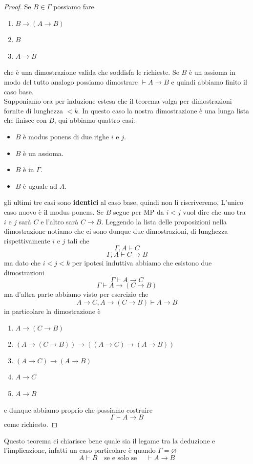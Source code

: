 \documentclass[11pt]{scrartcl}
\begin{document}
\begin{proof}
		Se $B\in \Gamma$ possiamo fare
		\begin{enumerate}
			\item $B\to (A \to B)$
			\item $B$ 
			\item $A\to B$ 
		\end{enumerate}
		che è una dimostrazione valida che soddisfa le richieste. Se $B$ è un assioma in modo del tutto analogo possiamo dimostrare $\vdash A \to B$ e quindi abbiamo finito il caso base. \\
		Supponiamo ora per induzione estesa che il teorema valga per dimostrazioni fornite di lunghezza $<k$. In questo caso la nostra dimostrazione è una lunga lista che finisce con $B$, qui abbiamo quattro casi:
		\begin{itemize}
			\item  $B$ è modus ponens di due righe $i$ e $j$.
			\item  $B$ è un assioma.
			\item  $B$ è in $\Gamma$.
			\item  $B$ è uguale ad $A$.
		\end{itemize}
		gli ultimi tre casi sono \textbf{identici} al caso base, quindi non li riscriveremo. L'unico caso nuovo è il modus ponens. Se $B$ segue per MP da $i<j$ vuol dire che uno tra $i$ e $j$ sarà $C$ e l'altro sarà $C\to B$. Leggendo la lista delle proposizioni nella dimostrazione notiamo che ci sono dunque due dimostrazioni, di lunghezza rispettivamente $i$ e $j$ tali che
		$$\Gamma,A\vdash C$$
		$$\Gamma,A \vdash C\to B$$
		ma dato che $i<j<k$ per ipotesi induttiva abbiamo che esistono due dimostrazioni
		$$\Gamma \vdash A\to C$$
		$$\Gamma \vdash A \to(C\to B)$$
		ma d'altra parte abbiamo visto per esercizio che 
		$$A\to C , A \to (C \to B)\vdash A \to B$$
		in particolare la dimostrazione è
		\begin{enumerate}
			\item $A\to (C\to B)$
			\item $(A\to (C\to B)) \to ((A\to C)\to (A\to B))$
			\item $(A\to C)\to (A \to B)  $
			\item $A\to C$ 
			\item $A\to B$
		\end{enumerate}
		e dunque abbiamo proprio che possiamo costruire
		$$\Gamma\vdash A\to B$$
		come richiesto.
	\end{proof}
	\begin{remark}
		Questo teorema ci chiarisce bene quale sia il legame tra la deduzione e l'implicazione, infatti un caso particolare è quando $\Gamma = \varnothing$
		$$A\vdash B \quad \text{se e solo se } \quad \vdash A\to B$$
	\end{remark}
\end{document}
